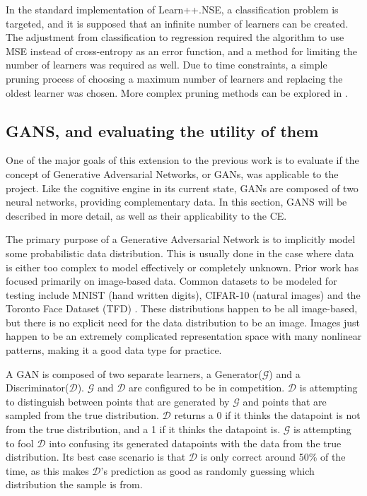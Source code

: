 	\par In the standard implementation of Learn++.NSE, a classification problem is targeted, and it is supposed that an infinite number of learners can be created. The adjustment from classification to regression required the algorithm to use MSE instead of cross-entropy as an error function, and a method for limiting the number of learners was required as well. Due to time constraints, a simple pruning process of choosing a maximum number of learners and replacing the oldest learner was chosen. More complex pruning methods can be explored in \cite{PlaceholderCitation}.
	\subsection {GANS, and evaluating the utility of them}
	\par One of the major goals of this extension to the previous work is to evaluate if the concept of Generative Adversarial Networks, or GANs, was applicable to the project. Like the cognitive engine in its current state, GANs are composed of two neural networks, providing complementary data. In this section, GANS will be described in more detail, as well as their applicability to the CE.  
	\par The primary purpose of a Generative Adversarial Network is to implicitly model some probabilistic data distribution. This is usually done in the case where data is either too complex to model effectively or completely unknown. Prior work has focused primarily on image-based data. Common datasets to be modeled for testing include MNIST (hand written digits), CIFAR-10 (natural images) and the Toronto Face Dataset (TFD) \cite{gan_overview}. These distributions happen to be all image-based, but there is no explicit need for the data distribution to be an image. Images just happen to be an extremely complicated representation space with many nonlinear patterns, making it a good data type for practice.
	\par A GAN is composed of two separate learners, a Generator($\mathcal{G}$) and a Discriminator($\mathcal{D}$). $\mathcal{G}$ and $\mathcal{D}$ are configured to be in competition. $\mathcal{D}$ is attempting to distinguish between points that are generated by $\mathcal{G}$ and points that are sampled from the true distribution. $\mathcal{D}$ returns a 0 if it thinks the datapoint is not from the true distribution, and a 1 if it thinks the datapoint is. $\mathcal{G}$ is attempting to fool $\mathcal{D}$ into confusing its generated datapoints with the data from the true distribution. Its best case scenario is that $\mathcal{D}$ is only correct around 50\% of the time, as this makes $\mathcal{D}$'s prediction as good as randomly guessing which distribution the sample is from.
